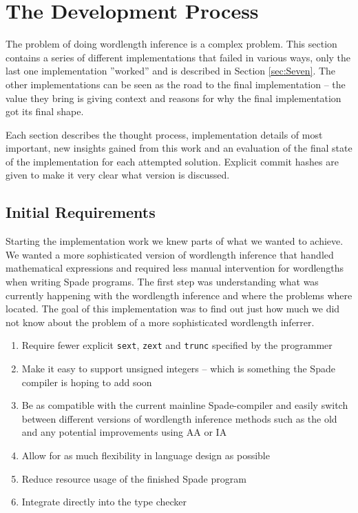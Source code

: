 \chapter{The Development Process}
\label{cha:Results}
The problem of doing wordlength inference is a complex problem. This section contains a series of different implementations that failed in various ways, only the last one implementation ''worked'' and is described in Section \ref{sec:Seven}. The other implementations can be seen as the road to the final implementation -- the value they bring is giving context and reasons for why the final implementation got its final shape.

Each section describes the thought process, implementation details of most important, new insights gained from this work and an evaluation of the final state of the implementation for each attempted solution. Explicit commit hashes are given to make it very clear what version is discussed.

\section{Initial Requirements}
\label{sec:initialReq}
Starting the implementation work we knew parts of what we wanted to achieve. We wanted a more sophisticated version of wordlength inference that handled mathematical expressions and required less manual intervention for wordlengths when writing Spade programs. The first step was understanding what was currently happening with the wordlength inference and where the problems where located. The goal of this implementation was to find out just how much we did not know about the problem of a more sophisticated wordlength inferrer.

\begin{enumerate}
  \label{figReq}
    \item Require fewer explicit \verb|sext|, \verb|zext| and \verb|trunc| specified by the programmer
    \item Make it easy to support unsigned integers -- which is something the Spade compiler is hoping to add soon
    \item Be as compatible with the current mainline Spade-compiler and easily switch between different versions of wordlength inference methods such as the old and any potential improvements using AA or IA
    \item Allow for as much flexibility in language design as possible
    \item Reduce resource usage of the finished Spade program
    \item Integrate directly into the type checker
\end{enumerate}

